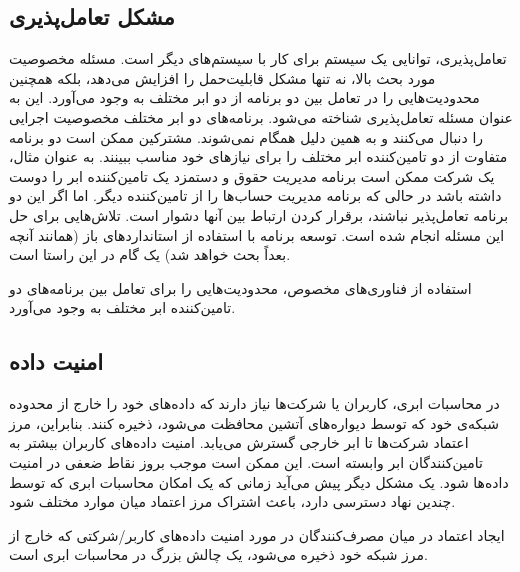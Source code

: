 \documentclass{book}
\begin{document}
    \subsection{مشکل تعامل‌پذیری}

        تعامل‌پذیری، توانایی یک سیستم برای کار با سیستم‌های دیگر است. مسئله مخصوصیت مورد بحث بالا، نه تنها مشکل قابلیت‌حمل را افزایش می‌دهد، بلکه همچنین محدودیت‌هایی را در تعامل بین دو برنامه از دو ابر مختلف به وجود می‌آورد. این به عنوان مسئله تعامل‌پذیری شناخته می‌شود. برنامه‌های دو ابر مختلف مخصوصیت اجرایی را دنبال می‌کنند و به همین دلیل همگام نمی‌شوند. مشترکین ممکن است دو برنامه متفاوت از دو تامین‌کننده ابر مختلف را برای نیازهای خود مناسب ببینند. به عنوان مثال، یک شرکت ممکن است برنامه مدیریت حقوق و دستمزد یک تامین‌کننده ابر را دوست داشته باشد در حالی که برنامه مدیریت حساب‌ها را از تامین‌کننده دیگر. اما اگر این دو برنامه تعامل‌پذیر نباشند، برقرار کردن ارتباط بین آنها دشوار است. تلاش‌هایی برای حل این مسئله انجام شده است. توسعه برنامه با استفاده از استانداردهای باز (همانند آنچه بعداً بحث خواهد شد) یک گام در این راستا است.

    \begin{addinfo}
        
        استفاده از فناوری‌های مخصوص، محدودیت‌هایی را برای تعامل بین برنامه‌های دو تامین‌کننده ابر مختلف به وجود می‌آورد.

    \end{addinfo}

    \subsection{امنیت داده}

        در محاسبات ابری، کاربران یا شرکت‌ها نیاز دارند که داده‌های خود را خارج از محدوده شبکه‌ی خود که توسط دیواره‌های آتشین محافظت می‌شود، ذخیره کنند. بنابراین، مرز اعتماد شرکت‌ها تا ابر خارجی گسترش می‌یابد. امنیت داده‌های کاربران بیشتر به تامین‌کنندگان ابر وابسته است. این ممکن است موجب بروز نقاط ضعفی در امنیت داده‌ها شود. یک مشکل دیگر پیش می‌آید زمانی که یک امکان محاسبات ابری که توسط چندین نهاد دسترسی دارد، باعث اشتراک مرز اعتماد میان موارد مختلف شود.
    
    \begin{addinfo}

        ایجاد اعتماد در میان مصرف‌کنندگان در مورد امنیت داده‌های کاربر/شرکتی که خارج از مرز شبکه خود ذخیره می‌شود، یک چالش بزرگ در محاسبات ابری است.
        
    \end{addinfo}
\end{document}
